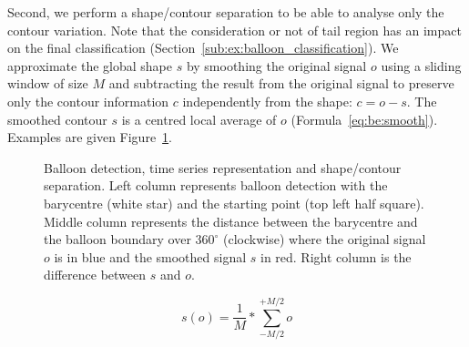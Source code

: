 Second, we perform a shape/contour separation to be able to analyse only the contour variation.
Note that the consideration or not of tail region has an impact on the final classification (Section~\ref{sub:ex:balloon_classification}).
We approximate the global shape $s$ by smoothing the original signal $o$ using a sliding window of size $M$ and subtracting the result from the original signal to preserve only the contour information $c$ independently from the shape: $c = o - s$. The smoothed contour $s$ is a centred local average of $o$ (Formula~\ref{eq:be:smooth}).
Examples are given Figure~\ref{fig:be:time_series}.


	\begin{figure}[!ht]	%
	  \centering
		\caption[Balloon contour time series]{Balloon detection, time series representation and shape/contour separation. Left column represents balloon detection with the barycentre (white star) and the starting point (top left half square). Middle column represents the distance between the barycentre and the balloon boundary over $360^\circ$ (clockwise) where the original signal $o$ is in blue and the smoothed signal $s$ in red. Right column is the difference between $s$ and $o$.}
		\label{fig:be:time_series}
	\end{figure}

\begin{equation}
\label{eq:be:smooth}
 s(o) = \frac{1}{M} * \sum_{-M/2}^{+M/2} o
\end{equation}



